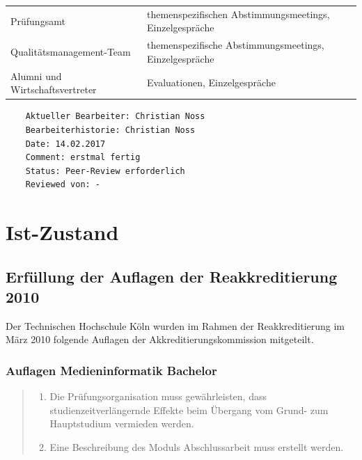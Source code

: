 \begin{longtable}[c]{@{}ll@{}}
\begin{minipage}[t]{0.5\columnwidth}
Prüfungsamt
\strut\end{minipage} &
\begin{minipage}[t]{0.5\columnwidth}\raggedright\strut
themenspezifischen Abstimmungsmeetings, Einzelgespräche
\strut\end{minipage}\tabularnewline
\begin{minipage}[t]{0.5\columnwidth}\raggedright\strut
Qualitätsmanagement-Team
\strut\end{minipage} &
\begin{minipage}[t]{0.5\columnwidth}\raggedright\strut
themenspezifische Abstimmungsmeetings, Einzelgespräche
\strut\end{minipage}\tabularnewline
\begin{minipage}[t]{0.5\columnwidth}\raggedright\strut
Alumni und Wirtschaftsvertreter
\strut\end{minipage} &
\begin{minipage}[t]{0.5\columnwidth}\raggedright\strut
Evaluationen, Einzelgespräche
\strut\end{minipage}\tabularnewline
\bottomrule
\end{longtable}

\begin{verbatim}
    Aktueller Bearbeiter: Christian Noss
    Bearbeiterhistorie: Christian Noss
    Date: 14.02.2017
    Comment: erstmal fertig
    Status: Peer-Review erforderlich
    Reviewed von: -
\end{verbatim}

\chapter{Ist-Zustand}\label{ist-zustand}

\section{Erfüllung der Auflagen der Reakkreditierung
2010}\label{erfuxfcllung-der-auflagen-der-reakkreditierung-2010}

Der Technischen Hochschule Köln wurden im Rahmen der Reakkreditierung im
März 2010 folgende Auflagen der Akkreditierungskommission mitgeteilt.

\subsection{Auflagen Medieninformatik
Bachelor}\label{auflagen-medieninformatik-bachelor}

\begin{quote}
\begin{enumerate}
\def\labelenumi{\arabic{enumi}.}
\tightlist
\item
  Die Prüfungsorganisation muss gewährleisten, dass
  studienzeitverlängernde Effekte beim Übergang vom Grund- zum
  Hauptstudium vermieden werden.
\item
  Eine Beschreibung des Moduls Abschlussarbeit muss erstellt werden.
\end{enumerate}
\end{quote}

